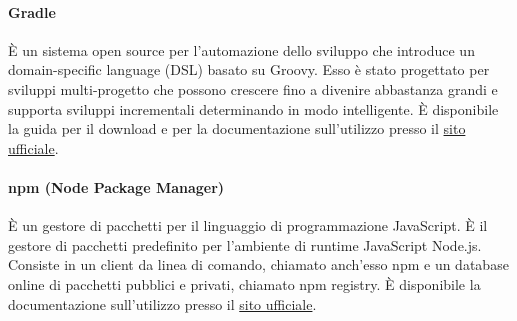 \paragraph{Gradle}\hbox{}
È un sistema open source per l'automazione dello sviluppo che introduce un domain-specific language (DSL) basato su Groovy.
Esso è stato progettato per sviluppi multi-progetto che possono crescere fino a divenire abbastanza grandi e supporta sviluppi incrementali determinando in modo intelligente.
È disponibile la guida per il download e per la documentazione sull'utilizzo presso il \href{https://gradle.org/}{sito ufficiale}.

\paragraph{npm (Node Package Manager)}\hbox{}
È un gestore di pacchetti per il linguaggio di programmazione JavaScript. È il gestore di pacchetti predefinito per l'ambiente di runtime JavaScript Node.js. 
Consiste in un client da linea di comando, chiamato anch'esso npm e un database online di pacchetti pubblici e privati, chiamato npm registry.
È disponibile la documentazione sull'utilizzo presso il \href{https://www.npmjs.com/}{sito ufficiale}.